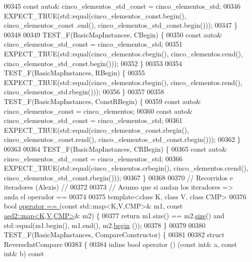 \begin{DoxyCode}
00345     \textcolor{keyword}{const} \textcolor{keyword}{auto}& cinco\_elementos\_std\_const = cinco\_elementos\_std;
00346     EXPECT\_TRUE(std::equal(cinco\_elementos\_const.begin(), cinco\_elementos\_const
      .end(), cinco\_elementos\_std\_const.begin()));
00347 \}
00348 
00349 TEST\_F(BasicMapInstances, CBegin) \{
00350     \textcolor{keyword}{const} \textcolor{keyword}{auto}& cinco\_elementos\_std\_const = cinco\_elementos\_std;
00351     EXPECT\_TRUE(std::equal(cinco\_elementos.cbegin(), cinco\_elementos.cend(), 
      cinco\_elementos\_std\_const.begin()));
00352 \}
00353 
00354 TEST\_F(BasicMapInstances, RBegin) \{
00355     EXPECT\_TRUE(std::equal(cinco\_elementos.rbegin(), cinco\_elementos.rend(), 
      cinco\_elementos\_std.rbegin()));
00356 \}
00357 
00358 TEST\_F(BasicMapInstances, ConstRBegin) \{
00359     \textcolor{keyword}{const} \textcolor{keyword}{auto}& cinco\_elementos\_const = cinco\_elementos;
00360     \textcolor{keyword}{const} \textcolor{keyword}{auto}& cinco\_elementos\_std\_const = cinco\_elementos\_std;
00361     EXPECT\_TRUE(std::equal(cinco\_elementos\_const.rbegin(), 
      cinco\_elementos\_const.rend(), cinco\_elementos\_std\_const.rbegin()));
00362 \}
00363 
00364 TEST\_F(BasicMapInstances, CRBegin) \{
00365     \textcolor{keyword}{const} \textcolor{keyword}{auto}& cinco\_elementos\_std\_const = cinco\_elementos\_std;
00366     EXPECT\_TRUE(std::equal(cinco\_elementos.crbegin(), cinco\_elementos.crend(), 
      cinco\_elementos\_std\_const.rbegin()));
00367 \}
00368 
00370 \textcolor{comment}{// Recorridos e iteradores (Alexis) //}
00372 \textcolor{comment}{}
00373 \textcolor{comment}{// Asumo que si andan los iteradores => anda el operador ==}
00374 
00375 \textcolor{keyword}{template}<\textcolor{keyword}{class} K, \textcolor{keyword}{class} V, \textcolor{keyword}{class} CMP>
00376 \textcolor{keywordtype}{bool} \hyperlink{classaed2_1_1map_abfc51b39670220e79037ac067006e933_abfc51b39670220e79037ac067006e933}{operator == }(\textcolor{keyword}{const} std::map<K,V,CMP>& m1, \textcolor{keyword}{const} \hyperlink{classaed2_1_1map}{aed2::map<K,V,CMP>}& m2) \{
00377     \textcolor{keywordflow}{return} m1.size() == m2.\hyperlink{classaed2_1_1map_a89f2613f926ac13293eafe65889d6021_a89f2613f926ac13293eafe65889d6021}{size}() and std::equal(m1.begin(), m1.end(), m2.\hyperlink{classaed2_1_1map_a58a95705d54b3dda7f775ce5a22225cb_a58a95705d54b3dda7f775ce5a22225cb}{begin}
      ());
00378 \}
00379 
00380 TEST\_F(BasicMapInstances, CompareConstructor) \{
00381 
00382     \textcolor{keyword}{struct }ReverseIntCompare
00383     \{
00384         \textcolor{keyword}{inline} \textcolor{keywordtype}{bool} operator () (\textcolor{keyword}{const} \textcolor{keywordtype}{int}& a, \textcolor{keyword}{const} \textcolor{keywordtype}{int}& b)\textcolor{keyword}{ const}

\end{DoxyCode}
